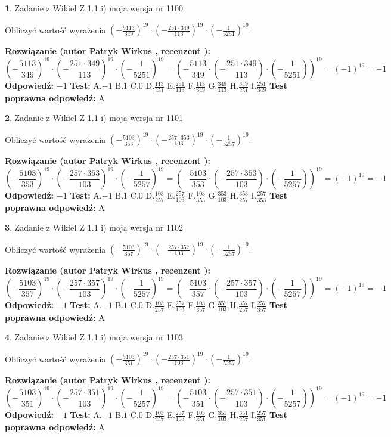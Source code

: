 \documentclass[12pt, a4paper]{article}
\theoremstyle{definition} %
\newtheorem{zad}{}
\newcommand{\zadStart}[1]{\begin{zad}#1\newline}
\newcommand{\zadStop}{\end{zad}}
\newcommand{\rozwStart}[2]{\noindent \textbf{Rozwiązanie (autor #1 , recenzent #2): }\newline}
\newcommand{\rozwStop}{\newline}
\newcommand{\odpStart}{\noindent \textbf{Odpowiedź:}\newline}
\newcommand{\odpStop}{\newline}
\newcommand{\testStart}{\noindent \textbf{Test:}\newline}
\newcommand{\testStop}{\newline}
\newcommand{\kluczStart}{\noindent \textbf{Test poprawna odpowiedź:}\newline}
\newcommand{\kluczStop}{\newline}
\begin{document}
\zadStart{Zadanie z Wikieł Z 1.1 i) moja wersja nr 1100}

Obliczyć wartość wyrażenia $(-\frac{5113}{349})^{19} \cdot (-\frac{251 \cdot 349}{113})^{19} \cdot (-\frac{1}{5251})^{19}$.
\zadStop
\rozwStart{Patryk Wirkus}{}
$$(-\frac{5113}{349})^{19} \cdot (-\frac{251 \cdot 349}{113})^{19} \cdot (-\frac{1}{5251})^{19} = (-\frac{5113}{349} \cdot (-\frac{251 \cdot 349}{113}) \cdot (-\frac{1}{5251}))^{19} = (-1)^{19} = -1$$
\rozwStop
\odpStart
$-1$
\odpStop
\testStart
A.$-1$ B.$1$ C.$0$ D.$\frac{113}{251}$ E.$\frac{251}{113}$
F.$\frac{113}{349}$ G.$\frac{349}{113}$
H.$\frac{349}{251}$
I.$\frac{251}{349}$
\testStop
\kluczStart
A
\kluczStop



\zadStart{Zadanie z Wikieł Z 1.1 i) moja wersja nr 1101}

Obliczyć wartość wyrażenia $(-\frac{5103}{353})^{19} \cdot (-\frac{257 \cdot 353}{103})^{19} \cdot (-\frac{1}{5257})^{19}$.
\zadStop
\rozwStart{Patryk Wirkus}{}
$$(-\frac{5103}{353})^{19} \cdot (-\frac{257 \cdot 353}{103})^{19} \cdot (-\frac{1}{5257})^{19} = (-\frac{5103}{353} \cdot (-\frac{257 \cdot 353}{103}) \cdot (-\frac{1}{5257}))^{19} = (-1)^{19} = -1$$
\rozwStop
\odpStart
$-1$
\odpStop
\testStart
A.$-1$ B.$1$ C.$0$ D.$\frac{103}{257}$ E.$\frac{257}{103}$
F.$\frac{103}{353}$ G.$\frac{353}{103}$
H.$\frac{353}{257}$
I.$\frac{257}{353}$
\testStop
\kluczStart
A
\kluczStop



\zadStart{Zadanie z Wikieł Z 1.1 i) moja wersja nr 1102}

Obliczyć wartość wyrażenia $(-\frac{5103}{357})^{19} \cdot (-\frac{257 \cdot 357}{103})^{19} \cdot (-\frac{1}{5257})^{19}$.
\zadStop
\rozwStart{Patryk Wirkus}{}
$$(-\frac{5103}{357})^{19} \cdot (-\frac{257 \cdot 357}{103})^{19} \cdot (-\frac{1}{5257})^{19} = (-\frac{5103}{357} \cdot (-\frac{257 \cdot 357}{103}) \cdot (-\frac{1}{5257}))^{19} = (-1)^{19} = -1$$
\rozwStop
\odpStart
$-1$
\odpStop
\testStart
A.$-1$ B.$1$ C.$0$ D.$\frac{103}{257}$ E.$\frac{257}{103}$
F.$\frac{103}{357}$ G.$\frac{357}{103}$
H.$\frac{357}{257}$
I.$\frac{257}{357}$
\testStop
\kluczStart
A
\kluczStop



\zadStart{Zadanie z Wikieł Z 1.1 i) moja wersja nr 1103}

Obliczyć wartość wyrażenia $(-\frac{5103}{351})^{19} \cdot (-\frac{257 \cdot 351}{103})^{19} \cdot (-\frac{1}{5257})^{19}$.
\zadStop
\rozwStart{Patryk Wirkus}{}
$$(-\frac{5103}{351})^{19} \cdot (-\frac{257 \cdot 351}{103})^{19} \cdot (-\frac{1}{5257})^{19} = (-\frac{5103}{351} \cdot (-\frac{257 \cdot 351}{103}) \cdot (-\frac{1}{5257}))^{19} = (-1)^{19} = -1$$
\rozwStop
\odpStart
$-1$
\odpStop
\testStart
A.$-1$ B.$1$ C.$0$ D.$\frac{103}{257}$ E.$\frac{257}{103}$
F.$\frac{103}{351}$ G.$\frac{351}{103}$
H.$\frac{351}{257}$
I.$\frac{257}{351}$
\testStop
\kluczStart
A
\kluczStop
\end{document}
